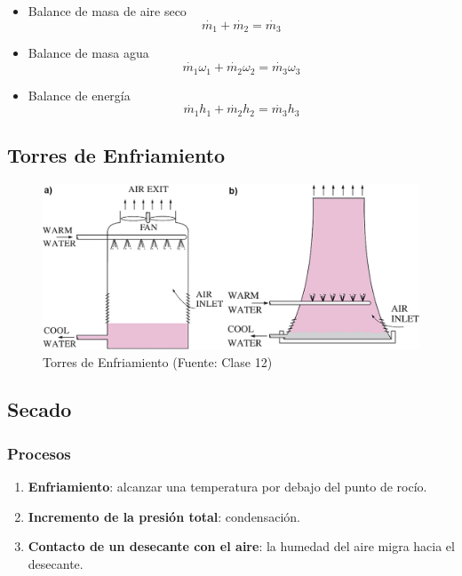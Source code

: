 \begin{multicols}{2}
            \begin{itemize}
                \item Balance de masa de aire seco
                \[\dot{m_{1}} + \dot{m_{2}} = \dot{m_{3}}\]
                
                \item Balance de masa agua
                \[\dot{m_{1}}\omega_{1} + \dot{m_{2}}\omega_{2} = \dot{m_{3}}\omega_{3}\]
                
                \item Balance de energía
                \[\dot{m_{1}}h_{1} + \dot{m_{2}}h_{2} = \dot{m_{3}}h_{3}\]
            \end{itemize}
        
        \end{multicols}
    
    \subsection{Torres de Enfriamiento}
    
    \begin{figure}
        \includegraphics[width=.8\textwidth]{img/clases/torres_enfriamiento.png}
        \caption{Torres de Enfriamiento (Fuente: Clase 12)}
        \label{fig:torres_enfriamiento}
    \end{figure}
    
    \subsection{Secado}
    
        \subsubsection{Procesos}
        
        \begin{enumerate}
            \item \textbf{Enfriamiento}: alcanzar una temperatura por debajo del punto de rocío.
            \item \textbf{Incremento de la presión total}: condensación.
            \item \textbf{Contacto de un desecante con el aire}: la humedad del aire migra hacia el desecante.
        \end{enumerate}
        

